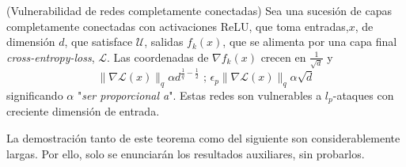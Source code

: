 \begin{teorema}(Vulnerabilidad de redes completamente conectadas) \label{teom23}
Sea una sucesión de capas completamente conectadas con activaciones ReLU, que toma entradas,$x$, de dimensión $d$, que satisface $\mathcal{U}$, salidas $f_k(x)$, que se alimenta por una capa final \textit{cross-entropy-loss}, $\mathcal{L}$. Las coordenadas de $\nabla f_k(x)$ crecen en $\frac{1}{\sqrt{d}}$ y 
$$\| \nabla \mathcal{L}(x) \|_q \alpha d^{\frac{1}{q}-\frac{1}{2}}  \text{      ;      } \epsilon_p \| \nabla \mathcal{L}(x) \|_q \alpha \sqrt{d}$$
significando $\alpha$ "\textit{ser proporcional a}".
Estas redes son vulnerables a $l_p$-ataques con creciente dimensión de entrada.
\end{teorema}

La demostración tanto de este teorema como del siguiente son considerablemente largas. Por ello, solo se enunciarán los resultados auxiliares, sin probarlos.

